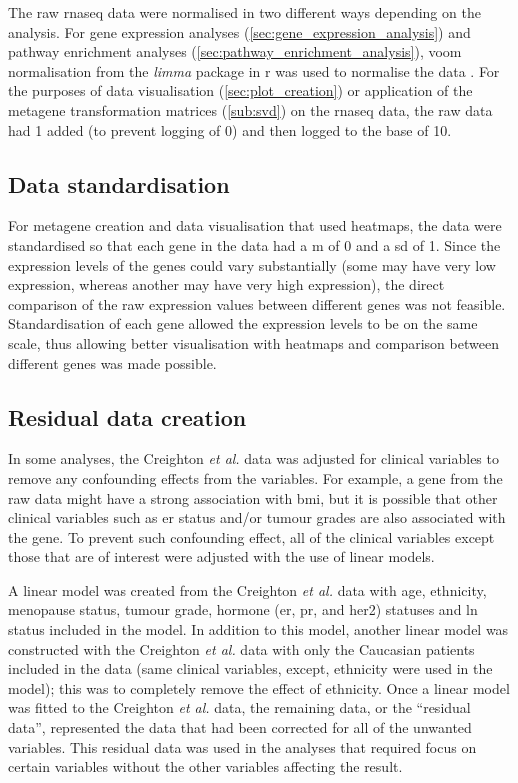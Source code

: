 The raw \gls{rnaseq} data were normalised in two different ways depending on the analysis.
For gene expression analyses (\cref{sec:gene_expression_analysis}) and pathway enrichment analyses (\cref{sec:pathway_enrichment_analysis}), voom normalisation from the \textit{limma} package in \gls{r} was used to normalise the data \citep{Ritchie2015}.
For the purposes of data visualisation (\cref{sec:plot_creation}) or application of the metagene transformation matrices (\cref{sub:svd}) on the \gls{rnaseq} data, the raw data had 1 added (to prevent logging of 0) and then logged to the base of 10.

\subsection{Data standardisation}
\label{sub:data_standardisation}

For metagene creation and data visualisation that used heatmaps, the data were standardised so that each gene in the data had a \gls{m} of 0 and a \gls{sd} of 1.
Since the expression levels of the genes could vary substantially (some may have very low expression, whereas another may have very high expression), the direct comparison of the raw expression values between different genes was not feasible.
Standardisation of each gene allowed the expression levels to be on the same scale, thus allowing better visualisation with heatmaps and comparison between different genes was made possible.

\subsection{Residual data creation}
\label{sub:residual_data_creation}

In some analyses, the Creighton \textit{et al.} data was adjusted for clinical variables to remove any confounding effects from the variables.
For example, a gene from the raw data might have a strong association with \gls{bmi}, but it is possible that other clinical variables such as \gls{er} status and/or tumour grades are also associated with the gene.
To prevent such confounding effect, all of the clinical variables except those that are of interest were adjusted with the use of linear models.

A linear model was created from the Creighton \textit{et al.} data with age, ethnicity, menopause status, tumour grade, hormone (\gls{er}, \gls{pr}, and \gls{her2}) statuses  and \gls{ln} status included in the model.
In addition to this model, another linear model was constructed with the Creighton \textit{et al.} data with only the Caucasian patients included in the data (same clinical variables, except, ethnicity were used in the model); this was to completely remove the effect of ethnicity.
Once a linear model was fitted to the Creighton \textit{et al.} data, the remaining data, or the ``residual data'', represented the data that had been corrected for all of the unwanted variables.
This residual data was used in the analyses that required focus on certain variables without the other variables affecting the result.

